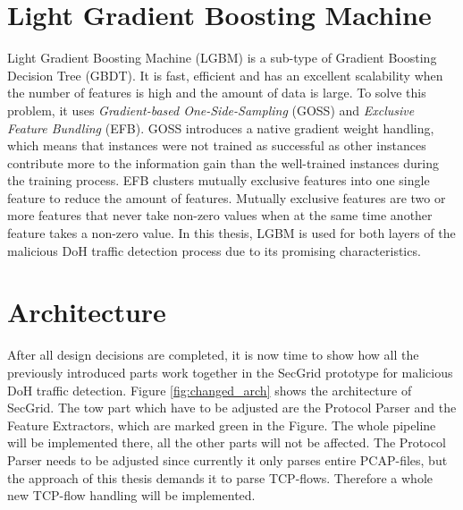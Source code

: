 \section{Light Gradient Boosting Machine} \label{LGBM}
Light Gradient Boosting Machine (LGBM) \cite{ke2017lightgbm} is a sub-type of Gradient Boosting Decision Tree (GBDT). It is fast, efficient and has an excellent scalability when the number of features is high and the amount of data is large. To solve this problem, it uses \textit{Gradient-based One-Side-Sampling} (GOSS) and \textit{Exclusive Feature Bundling} (EFB). GOSS introduces a native gradient weight handling, which means that instances were not trained as successful as other instances contribute more to the information gain than the well-trained instances during the training process. EFB clusters mutually exclusive features into one single feature to reduce the amount of features. Mutually exclusive features are two or more features that never take non-zero values when at the same time another feature takes a non-zero value. In this thesis, LGBM is used for both layers of the malicious DoH traffic detection process due to its promising characteristics. 

\section{Architecture} \label{architecture}
After all design decisions are completed, it is now time to show how all the previously introduced parts work together in the SecGrid prototype for malicious DoH traffic detection. Figure \ref{fig:changed_arch} shows the architecture of SecGrid. The tow part which have to be adjusted are the Protocol Parser and the Feature Extractors, which are marked green in the Figure. The whole pipeline will be implemented there, all the other parts will not be affected. The Protocol Parser needs to be adjusted since currently it only parses entire PCAP-files, but the approach of this thesis demands it to parse TCP-flows. Therefore a whole new TCP-flow handling will be implemented.


